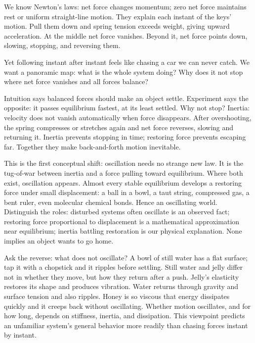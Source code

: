 
We know Newton's laws: net force changes momentum; zero net force maintains rest or uniform straight-line motion. They explain each instant of the keys' motion. Pull them down and spring tension exceeds weight, giving upward acceleration. At the middle net force vanishes. Beyond it, net force points down, slowing, stopping, and reversing them.

Yet following instant after instant feels like chasing a car we can never catch. We want a panoramic map: what is the whole system doing? Why does it not stop where net force vanishes and all forces balance?

Intuition says balanced forces should make an object settle. Experiment says the opposite: it passes equilibrium fastest, at its least settled. Why not stop? Inertia: velocity does not vanish automatically when force disappears. After overshooting, the spring compresses or stretches again and net force reverses, slowing and returning it. Inertia prevents stopping in time; restoring force prevents escaping far. Together they make back-and-forth motion inevitable.

This is the first conceptual shift: oscillation needs no strange new law. It is the tug-of-war between inertia and a force pulling toward equilibrium. Where both exist, oscillation appears. Almost every stable equilibrium develops a restoring force under small displacement: a ball in a bowl, a taut string, compressed gas, a bent ruler, even molecular chemical bonds. Hence an oscillating world. Distinguish the roles: disturbed systems often oscillate is an observed fact; restoring force proportional to displacement is a mathematical approximation near equilibrium; inertia battling restoration is our physical explanation. None implies an object wants to go home.

Ask the reverse: what does not oscillate? A bowl of still water has a flat surface; tap it with a chopstick and it ripples before settling. Still water and jelly differ not in whether they move, but how they return after a push. Jelly's elasticity restores its shape and produces vibration. Water returns through gravity and surface tension and also ripples. Honey is so viscous that energy dissipates quickly and it creeps back without oscillating. Whether motion oscillates, and for how long, depends on stiffness, inertia, and dissipation. This viewpoint predicts an unfamiliar system's general behavior more readily than chasing forces instant by instant.

